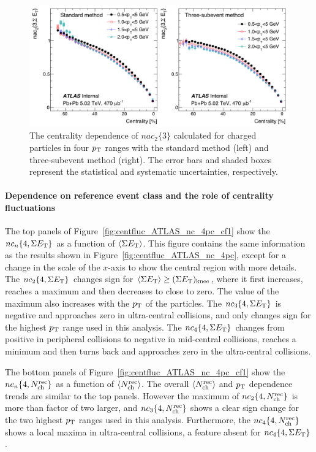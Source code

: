 \begin{figure}[H]
\centering
\includegraphics[width=.95\linewidth]{figs/chapter_centfluc/ATLAS_nac2.png}
\caption{The centrality dependence of $nac_{2}\{3\}$ calculated for charged particles in four $p_\text{T}$ ranges with the standard method (left) and three-subevent method (right). The error bars and shaded boxes represent the statistical and systematic uncertainties, respectively.}
\label{fig:centfluc_ATLAS_nac2}
\end{figure}



\paragraph{Dependence on reference event class and the role of centrality fluctuations}
\label{sec:dependence_on_reference_event_class_and_the_role_of_centrality_fluctuations}

The top panels of Figure~\ref{fig:centfluc_ATLAS_nc_4pc_cf1} show the $nc_n\{4, \Sigma E_\text{T}\}$ as a function of $\left\langle \Sigma E_\text{T}\right\rangle$. This figure contains the same information as the results shown in Figure~\ref{fig:centfluc_ATLAS_nc_4pc}, except for a change in the scale of the $x$-axis to show the central region with more details. The $nc_2\{4, \Sigma E_\text{T}\}$ changes sign for $\left\langle \Sigma E_\text{T}\right\rangle \ge (\Sigma E_\text{T})_\text{knee}$, where it first increases, reaches a maximum and then decreases to close to zero. The value of the maximum also increases with the $p_\text{T}$ of the particles. The $nc_3\{4, \Sigma E_\text{T}\}$ is negative and approaches zero in ultra-central collisions, and only changes sign for the highest $p_\text{T}$ range used in this analysis. The $nc_4\{4, \Sigma E_\text{T}\}$ changes from positive in peripheral collisions to negative in mid-central collisions, reaches a minimum and then turns back and approaches zero in the ultra-central collisions.

The bottom panels of Figure~\ref{fig:centfluc_ATLAS_nc_4pc_cf1} show the $nc_n\{4, N_\text{ch}^\text{rec}\}$ as a function of $\left\langle N_\text{ch}^\text{rec}\right\rangle$. The overall $\left\langle N_\text{ch}^\text{rec}\right\rangle$ and $p_\text{T}$ dependence trends are similar to the top panels. However the maximum of $nc_2\{4, N_\text{ch}^\text{rec}\}$ is more than factor of two larger, and $nc_3\{4, N_\text{ch}^\text{rec}\}$ shows a clear sign change for the two highest $p_\text{T}$ ranges used in this analysis. Furthermore, the $nc_4\{4, N_\text{ch}^\text{rec}\}$ shows a local maxima in ultra-central collisions, a feature absent for $nc_4\{4, \Sigma E_\text{T}\}$.

